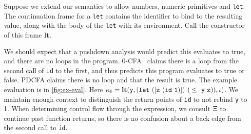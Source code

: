 \begin{center}
\end{center}


Suppose we extend our semantics to allow numbers, numeric primitives and \texttt{let}.
%
The continuation frame for a \texttt{let} contains the identifier to bind to the resulting value, along with the body of the \texttt{let} with its environment.
%
Call the constructor of this frame $\mathbf{lt}$.

We should expect that a pushdown analysis would predict this evaluates to true, and there are no loops in the program.
%
0-CFA~\citep{dvanhorn:Shivers:1991:CFA} claims there is a loop from the second call of \texttt{id} to the first, and thus predicts this program evaluates to true or false.
%
PDCFA claims there is no loop and that the result is true.
%
The example evaluation is in \autoref{fig:ex-eval}.
%
Here $\mkont_0 = \mathbf{lt}({\tt y}, {\tt (let\ ([z\ (id\ 1)])\ (}\le\ {\tt y}\ {\tt z))}, \iota)$.
%
We maintain enough context to distinguish the return points of \texttt{id} to not rebind \texttt{y} to 1.
%
When determining control flow through the expression, we consult $\Xi$ to continue past function returns, so there is no confusion about a back edge from the second call to \texttt{id}.
%

